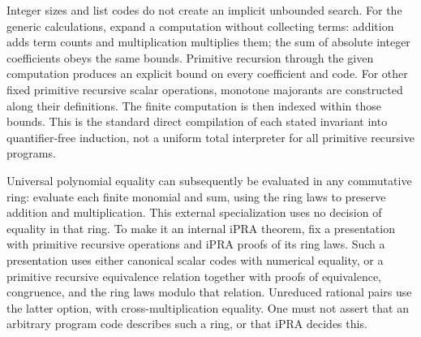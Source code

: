 Integer sizes and list codes do not create an implicit unbounded search.
For the generic calculations, expand a computation without collecting
terms: addition adds term counts and multiplication multiplies them;
the sum of absolute integer coefficients obeys the same bounds.
Primitive recursion through the given computation produces an explicit
bound on every coefficient and code. For other fixed primitive
recursive scalar operations, monotone majorants are constructed along
their definitions. The finite computation is then indexed within those
bounds. This is the standard direct compilation of each stated
invariant into quantifier-free induction, not a uniform total interpreter
for all primitive recursive programs.

Universal polynomial equality can subsequently be evaluated in any
commutative ring: evaluate each finite monomial and sum, using the ring
laws to preserve addition and multiplication. This external
specialization uses no decision of equality in that ring. To make it an
internal iPRA theorem, fix a presentation with primitive recursive
operations and iPRA proofs of its ring laws. Such a presentation uses
either canonical scalar codes with numerical equality, or a primitive
recursive equivalence relation together with proofs of equivalence,
congruence, and the ring laws modulo that relation. Unreduced rational
pairs use the latter option, with cross-multiplication equality.
One must not assert that an
arbitrary program code describes such a ring, or that iPRA decides this.

